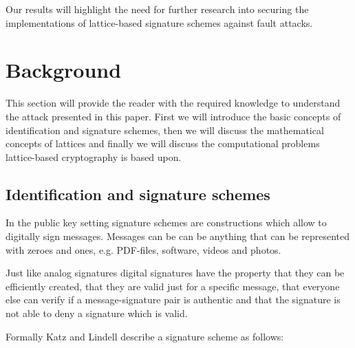 \documentclass[a4paper,titlepage]{article}
\begin{document}
Our results will highlight the need for further research into securing the implementations of lattice-based signature schemes against fault attacks.


\section{Background}
This section will provide the reader with the required knowledge to understand the attack presented in this paper. First we will introduce the basic concepts of identification and signature schemes, then we will discuss the mathematical concepts of lattices and finally we will discuss the computational problems lattice-based cryptography is based upon.

\subsection{Identification and signature schemes}
In the public key setting signature schemes are constructions which allow to digitally sign messages. Messages can be can be anything that can be represented with zeroes and ones, e.g. PDF-files, software, videos and photos.

Just like analog signatures digital signatures have the property that they can be efficiently created, that they are valid just for a specific message, that everyone else can verify if a message-signature pair is authentic and that the signature is not able to deny a signature which is valid.

Formally Katz and Lindell \cite{katzlindell} describe a signature scheme as follows:
\end{document}
